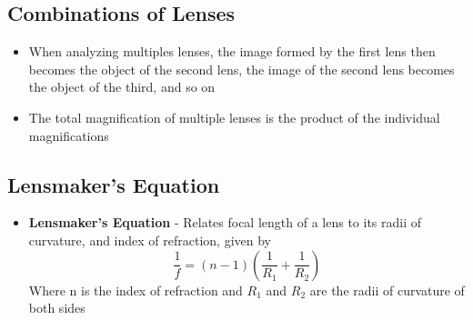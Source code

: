 \subsection{Combinations of Lenses}
\begin{itemize}
    \item When analyzing multiples lenses, the image formed by the first lens then becomes the object of the second lens, the image of the second lens becomes the object of the third, and so on
    \item The total magnification of multiple lenses is the product of the individual magnifications
\end{itemize}

\subsection{Lensmaker's Equation}
\begin{itemize}
    \item \textbf{Lensmaker's Equation} - Relates focal length of a lens to its radii of curvature, and index of refraction, given by \[\frac{1}{f}=(n-1)(\frac{1}{R_1}+\frac{1}{R_2})\] Where n is the index of refraction and \(R_1\) and \(R_2\) are the radii of curvature of both sides
\end{itemize}

\newpage
